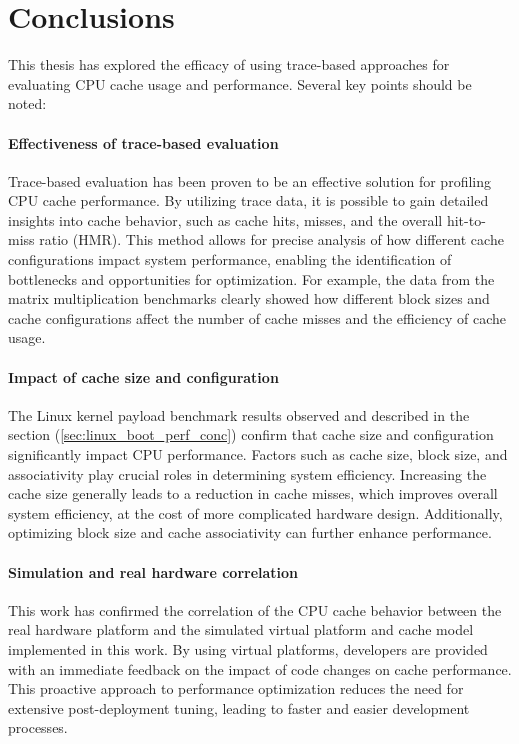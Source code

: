 
\chapter{Conclusions}

This thesis has explored the efficacy of using trace-based approaches for evaluating CPU cache usage and performance. Several key points should be noted:

\subsubsection*{Effectiveness of trace-based evaluation}

Trace-based evaluation has been proven to be an effective solution for profiling CPU cache performance.
By utilizing trace data, it is possible to gain detailed insights into cache behavior, such as cache hits, misses, and the overall hit-to-miss ratio (HMR). This method allows
for precise analysis of how different cache configurations impact system performance, enabling the identification of bottlenecks and opportunities for optimization.
For example, the data from the matrix multiplication benchmarks clearly showed how different block sizes and cache configurations affect the number of cache misses and the
efficiency of cache usage.

\subsubsection*{Impact of cache size and configuration}

The Linux kernel payload benchmark results observed and described in the section (\ref{sec:linux_boot_perf_conc}) confirm that cache size and configuration significantly impact CPU
performance. Factors such as cache size, block size, and associativity play crucial roles in determining system efficiency. Increasing the cache size generally leads to a reduction
in cache misses, which improves overall system efficiency, at the cost of more complicated hardware design. Additionally, optimizing block size and cache associativity can
further enhance performance.


\subsubsection*{Simulation and real hardware correlation}

This work has confirmed the correlation of the CPU cache behavior between the real hardware platform and the simulated virtual platform and cache model implemented in this work. By
using virtual platforms, developers are provided with an immediate feedback on the impact of code changes on cache performance. This proactive approach to performance optimization
reduces the need for extensive post-deployment tuning, leading to faster and easier development processes.

